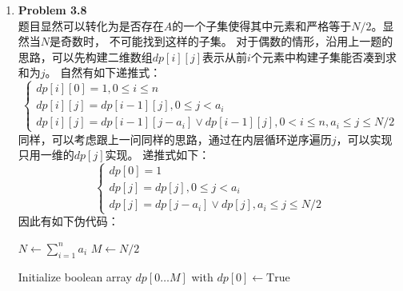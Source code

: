 \documentclass{ctexart}
\begin{document}
\begin{enumerate}[label=\arabic*.]
\begin{algorithm}[H]
            \Return $dp[D]$\;
        \end{algorithm}
        最坏情况下时间复杂度为$O(nD)$。
    \item \textbf{Problem 3.8}\\
        题目显然可以转化为是否存在$A$的一个子集使得其中元素和严格等于$N/2$。显然当$N$是奇数时，
        不可能找到这样的子集。
        对于偶数的情形，沿用上一题的思路，可以先构建二维数组$dp[i][j]$表示从前$i$个元素中构建子集能否凑到求和为$j$。
        自然有如下递推式：\[\begin{cases}
            dp[i][0]=1, 0\le{i}\le{n}\\
            dp[i][j]=dp[i-1][j],0\le{j}<a_i\\
            dp[i][j]=dp[i-1][j-a_i] \lor dp[i-1][j], 0<i\le{n},a_i\le{j}\le{N/2}
        \end{cases}\]
        同样，可以考虑跟上一问同样的思路，通过在内层循环逆序遍历$j$，可以实现只用一维的$dp[j]$实现。
        递推式如下：\[\begin{cases}
            dp[0]=1\\
            dp[j]=dp[j],0\le{j}<a_i\\
            dp[j]=dp[j-a_i] \lor dp[j],a_i\le{j}\le{N/2}
        \end{cases}\]
        因此有如下伪代码：\\
        \begin{algorithm}[H]
            \SetAlgoLined
            \caption{判断集合是否能划分为和相等的两个子集}
            
            $N \leftarrow \sum_{i=1}^{n} a_i$\;
            $M \leftarrow N / 2$\;
            
            Initialize boolean array $dp[0 \dots M]$ with \;
            $dp[0] \leftarrow \text{True}$\;
            

\end{algorithm}
\end{enumerate}
\end{document}
